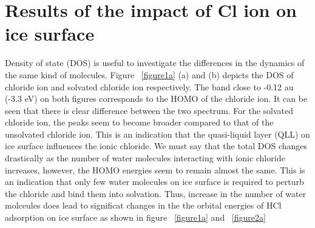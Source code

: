 \documentclass[a4paper,11pt]{report}
\begin{document}
\section{Results of the impact of Cl ion on ice surface}
Density of state (DOS) is useful to investigate the differences in the dynamics of the same kind of molecules. Figure ~\ref{figure1a} (a) and (b) depicts the DOS of chloride ion and solvated chloride ion respectively. The band close to -0.12 au (-3.3 eV) on both figures corresponds to the HOMO of the chloride ion. It can be seen that there is clear difference between the two spectrum. For the solvated chloride ion, the peaks seem to become broader compared to that of the unsolvated chloride ion. This is an indication that the quasi-liquid layer (QLL) on ice surface influences the ionic chloride. We must say that the total DOS changes drastically as the number of water molecules interacting with ionic chloride increases, however, the HOMO energies seem to remain almost the same. This is an indication that only few water molecules on ice surface is required to perturb the chloride and bind them into solvation. Thus, increase in the number of water molceules does lead to significat changes in the the orbital energies of HCl adsorption on ice surface as shown in figure ~\ref{figure1a} and ~\ref{figure2a}
\end{document}
